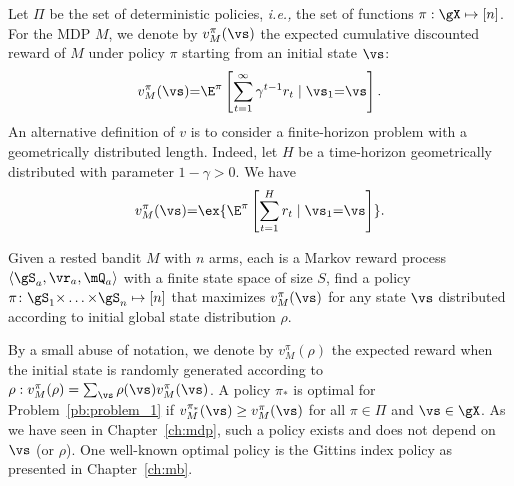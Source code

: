 Let $\Pi$ be the set of deterministic policies, \emph{i.e.,} the set of
functions $\pi:\gX\mapsto[n]$. For the MDP $M$, we denote by
$v_{M}^{\pi}(\vs)$ the expected cumulative discounted reward of ${M}$ under policy $\pi$ starting from an initial state $\vs$:
\[ v_{M}^\pi(\vs) {=}
\E^\pi\left[\sum_{t=1}^{\infty} \gamma^{t-1}r_t \mid \vs_1{=}\vs\right].\]
An alternative definition of $v$ is to consider a finite-horizon problem with a geometrically distributed length. Indeed, let $H$ be a time-horizon geometrically distributed with parameter $1-\gamma>0$. We have
\begin{equation}
    \label{eq:V-vs_R}
    v_{M}^\pi(\vs)  {=} \ex{\E^\pi\left[\sum_{t=1}^{H} r_t \mid \vs_1{=}\vs\right]}.
\end{equation}
\begin{prob}
\label{pb:problem_1}
Given a rested bandit $M$ with $n$ arms, each is a Markov reward process $\langle\gS_a,\vr_a,\mQ_a\rangle$ with a finite state space of size $S$, find a policy $\pi\colon\gS_1{\times}\dots{\times}\gS_n\mapsto[n]$ that maximizes $v_{M}^\pi(\vs)$ for any state $\vs$ distributed according to initial global state distribution $\rho$.
\end{prob}

By a small abuse of notation, we denote by $v_M^\pi(\rho)$ the expected reward when the initial state is randomly generated according to $\rho: v_M^\pi(\rho)=\sum_{\vs}\rho(\vs)v_{M}^\pi(\vs)$.
A policy
$\pi_*$ is optimal for Problem~\ref{pb:problem_1} if $ v_{M}^{\pi_*}(\vs) \ge v_{M}^\pi(\vs) $ for all
$\pi\in\Pi$ and $\vs\in\gX$.
As we have seen in Chapter~\ref{ch:mdp},
such a policy exists and does not depend on $\vs$ (or $\rho$). One well-known optimal policy is the Gittins index policy as presented in Chapter~\ref{ch:mb}. 

